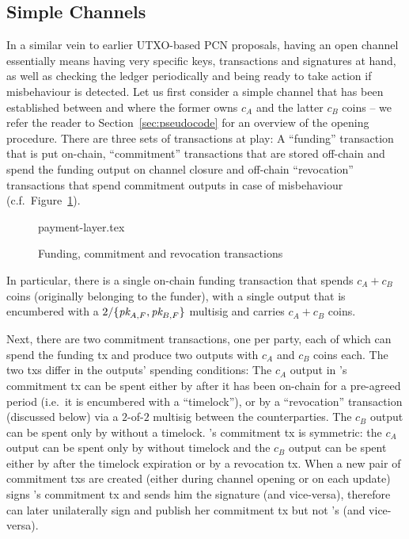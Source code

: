 \subsection{Simple Channels}
  In a similar vein to earlier UTXO-based PCN proposals, having an open channel essentially
  means having very specific keys, transactions and signatures at hand, as well
  as checking the ledger periodically and being ready to take action if
  misbehaviour is detected. Let us first consider a simple channel that has been
  established between \alice and \bob where the former owns $c_A$ and the latter
  $c_B$ coins -- we refer the reader to Section~\ref{sec:pseudocode} for an
  overview of the opening procedure. There are
  three sets of transactions at play: A ``funding''
  transaction that is put on-chain, ``commitment'' transactions that are stored
  off-chain and
  spend the funding output on channel closure and off-chain ``revocation''
  transactions that spend commitment outputs in case of misbehaviour (c.f.\
  Figure~\ref{figure:payment-layer}).

  \begin{figure}
    \centering
    {payment-layer.tex}
    \caption{Funding, commitment and revocation transactions}
    \label{figure:payment-layer}
  \end{figure}

  In particular, there is a single on-chain funding transaction that spends $c_A
  + c_B$ coins (originally belonging to the funder), with a single output that is encumbered with a
  $2/\{\textit{pk}_{A, F}, \textit{pk}_{B, F}\}$ multisig and carries $c_A + c_B$ coins.

  Next, there are two commitment transactions, one per party, each of which can spend the
  funding tx and produce two outputs with $c_A$ and $c_B$ coins each. The two
  txs differ in the outputs' spending conditions: The $c_A$ output in \alice's
  commitment tx can be spent either by \alice after it has been on-chain for a
  pre-agreed period (i.e.\ it is encumbered with a ``timelock''), or by a
  ``revocation'' transaction (discussed below) via a $2$-of-$2$ multisig between
  the counterparties. The $c_B$ output can be spent only by \bob without
  a timelock. \bob's commitment tx is symmetric: the $c_A$ output can be spent
  only by \alice without timelock and the $c_B$ output can be spent either by
  \bob after the timelock expiration or by a revocation tx. When a new pair of
  commitment txs are created (either during channel opening or on each update)
  \alice signs \bob's commitment tx and sends him the signature (and
  vice-versa), therefore \alice can later unilaterally sign and publish her commitment
  tx but not \bob's (and vice-versa).

